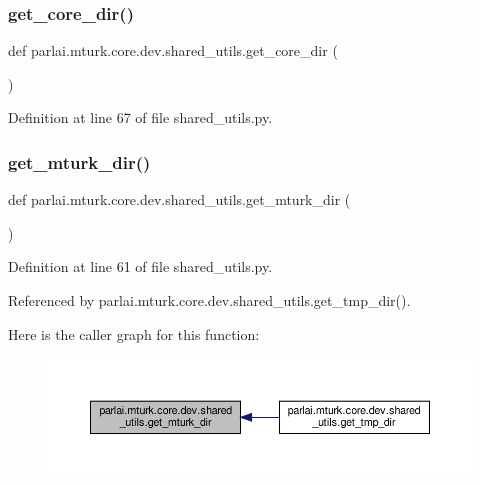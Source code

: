 \subsubsection{\texorpdfstring{get\+\_\+core\+\_\+dir()}{get\_core\_dir()}}
{\footnotesize\ttfamily def parlai.\+mturk.\+core.\+dev.\+shared\+\_\+utils.\+get\+\_\+core\+\_\+dir (\begin{DoxyParamCaption}{ }\end{DoxyParamCaption})}



Definition at line 67 of file shared\+\_\+utils.\+py.

\mbox{\label{namespaceparlai_1_1mturk_1_1core_1_1dev_1_1shared__utils_a1a7ab908ecffbfc1fabb5222625d35a2}} 
\subsubsection{\texorpdfstring{get\+\_\+mturk\+\_\+dir()}{get\_mturk\_dir()}}
{\footnotesize\ttfamily def parlai.\+mturk.\+core.\+dev.\+shared\+\_\+utils.\+get\+\_\+mturk\+\_\+dir (\begin{DoxyParamCaption}{ }\end{DoxyParamCaption})}



Definition at line 61 of file shared\+\_\+utils.\+py.



Referenced by parlai.\+mturk.\+core.\+dev.\+shared\+\_\+utils.\+get\+\_\+tmp\+\_\+dir().

Here is the caller graph for this function\+:
\nopagebreak
\begin{figure}[H]
\begin{center}
\leavevmode
\includegraphics[width=350pt]{namespaceparlai_1_1mturk_1_1core_1_1dev_1_1shared__utils_a1a7ab908ecffbfc1fabb5222625d35a2_icgraph}
\end{center}
\end{figure}
\mbox{\label{namespaceparlai_1_1mturk_1_1core_1_1dev_1_1shared__utils_a3bb51eaf0110918e082cae3ffd14d4d0}} 
